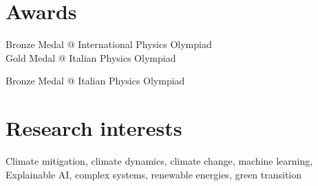 \documentclass[11pt, a4 paper]{article}
\begin{document}
\section*{Awards}
  \begin{description}[style=multiline,leftmargin=3cm,align=right]
    \item[2016]
      Bronze Medal @ International Physics Olympiad \\
      Gold Medal @ Italian Physics Olympiad
    \item[2015] Bronze Medal @ Italian Physics Olympiad
  \end{description}


\section*{Research interests}
  \begin{description}[style=multiline,leftmargin=3cm,align=right]
    \item[] Climate mitigation, climate dynamics, climate change, machine learning, Explainable AI, complex systems, renewable energies, green transition
  \end{description}


\end{document}
